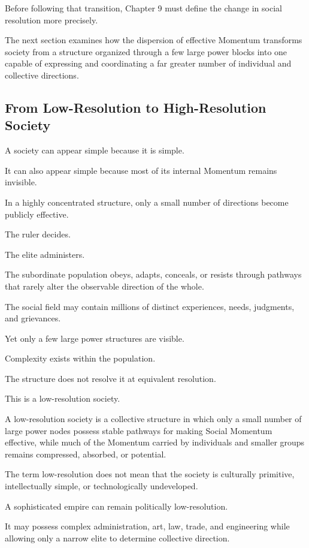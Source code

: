 Before following that transition, Chapter 9 must define the change in social resolution more precisely.

The next section examines how the dispersion of effective Momentum transforms society from a structure organized through a few large power blocks into one capable of expressing and coordinating a far greater number of individual and collective directions.

\subsection*{\textbf{From Low-Resolution to High-Resolution Society}}

A society can appear simple because it is simple.

It can also appear simple because most of its internal Momentum remains invisible.

In a highly concentrated structure, only a small number of directions become publicly effective.

The ruler decides.

The elite administers.

The subordinate population obeys, adapts, conceals, or resists through pathways that rarely alter the observable direction of the whole.

The social field may contain millions of distinct experiences, needs, judgments, and grievances.

Yet only a few large power structures are visible.

Complexity exists within the population.

The structure does not resolve it at equivalent resolution.

This is a low-resolution society.

A low-resolution society is a collective structure in which only a small number of large power nodes possess stable pathways for making Social Momentum effective, while much of the Momentum carried by individuals and smaller groups remains compressed, absorbed, or potential.

The term low-resolution does not mean that the society is culturally primitive, intellectually simple, or technologically undeveloped.

A sophisticated empire can remain politically low-resolution.

It may possess complex administration, art, law, trade, and engineering while allowing only a narrow elite to determine collective direction.

